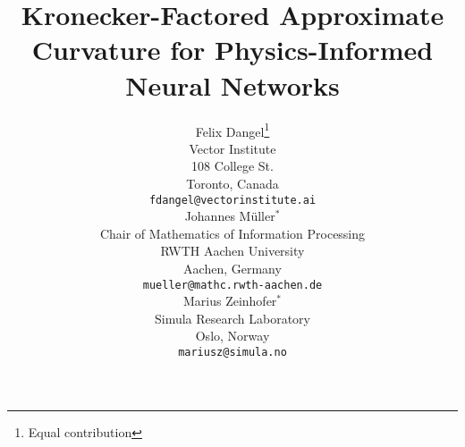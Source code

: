 \newcommand{\papertitle}{%
  Kronecker-Factored Approximate Curvature for Physics-Informed Neural Networks
}
\title{\papertitle}

%

\author{%
  Felix Dangel\thanks{Equal contribution}\\
  Vector Institute \\
  108 College St. \\
  Toronto, Canada \\
  \texttt{fdangel@vectorinstitute.ai} \\
  \And
  Johannes M\"uller$^*$\\
  Chair of Mathematics of Information Processing \\
  RWTH Aachen University \\
  Aachen, Germany \\
  \texttt{mueller@mathc.rwth-aachen.de} \\
  \And
  Marius Zeinhofer$^*$\\
  Simula Research Laboratory \\
  Oslo, Norway \\
  \texttt{mariusz@simula.no}
}
